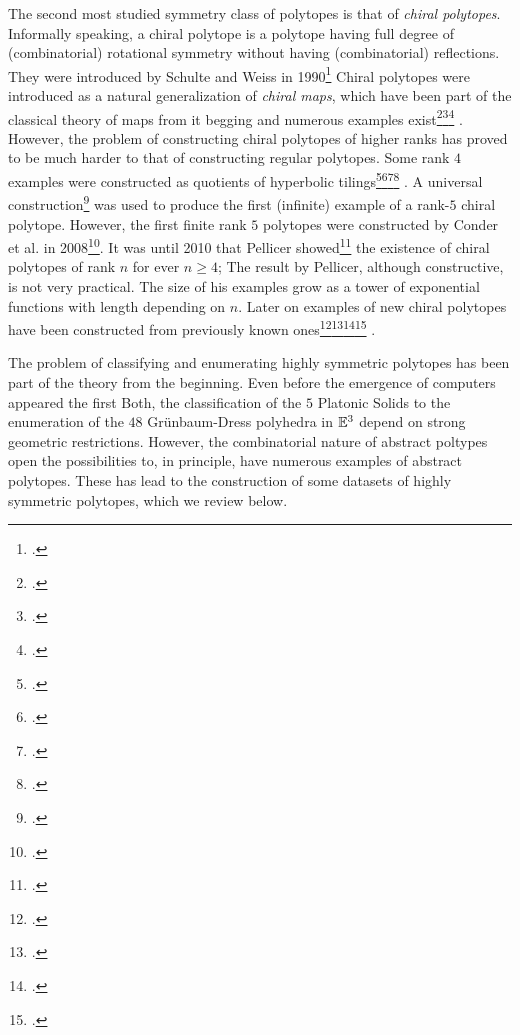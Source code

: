 The second most studied symmetry class of polytopes is that of \emph{chiral polytopes}.
Informally speaking, a chiral polytope is a polytope having full degree of (combinatorial) rotational symmetry without having (combinatorial) reflections.
They were introduced by Schulte and Weiss in 1990\footcite{SchulteWeiss_1991_ChiralPolytopes}
Chiral polytopes were introduced as a natural generalization of \emph{chiral maps}, which have been part of the classical theory of maps from it begging and numerous examples exist\footcite{CoxeterMoser_1972_GeneratorsRelationsDiscrete}\footcite{ConderDobcsanyi_2001_DeterminationAllRegular}\footcite{Sherk_1962_FamilyRegularMaps} .
However, the problem of constructing chiral polytopes of higher ranks has proved to be much harder to that of constructing regular polytopes. Some rank $4$ examples were constructed as quotients of hyperbolic tilings\footcite{NostrandSchulteWeiss_1993_ConstructionsChiralPolytopes}\footcite{SchulteWeiss_1994_ChiralityProjectiveLinear}\footcite{Nostrand_1994_RingExtensionsChiral}\footcite{NostrandSchulte_1995_ChiralPolytopesHyperbolic} .
A universal construction\footcite{SchulteWeiss_1995_FreeExtensionsChiral} was used to produce the first (infinite) example of a rank-$5$ chiral polytope.
However, the first finite rank $5$ polytopes were constructed by Conder et al. in 2008\footcite{ConderHubardPisanski_2008_ConstructionsChiralPolytopes}.
It was until 2010 that Pellicer showed\footcite{Pellicer_2010_ConstructionHigherRank} the existence of chiral polytopes of rank $n$ for ever $n \geq 4$;
The result by Pellicer, although constructive, is not very practical. The size of his examples grow as a tower of exponential functions with length depending on $n$.
Later on examples of new chiral polytopes have been constructed from previously known ones\footcite{CunninghamPellicer_2014_ChiralExtensionsChiral}\footcite{ConderZhang_2017_AbelianCoversChiral}\footcite{Montero_2019_ChiralExtensionsToroids_PhDThesis}\footcite{Montero_2021_SchlaefliSymbolChiral} .

The problem of classifying and enumerating highly symmetric polytopes has been part of the theory from the beginning.
Even before the emergence of computers appeared the first
Both, the classification of the $5$ Platonic Solids to the enumeration of the $48$ Grünbaum-Dress polyhedra in $\mathbb{E}^{3}$ depend on strong geometric restrictions.
However, the combinatorial nature of abstract poltypes open the possibilities to, in principle, have numerous examples of abstract polytopes.
These has lead to the construction of some datasets of highly symmetric polytopes, which we review below.

